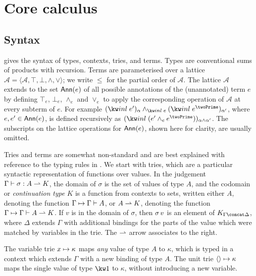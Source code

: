 \section{Core calculus}

\subsection{Syntax}

 gives the syntax of types, contexts, tries, and
terms. Types are conventional sums of products with recursion. Terms are
parameterised over a lattice $\mathcal{A} = \langle \mathcal{A}, \top, \bot,
\wedge, \vee\rangle$; we write $\leq$ for the partial order of $\mathcal{A}$.
The lattice $\mathcal{A}$ extends to the set $\Ann{e}$ of all possible
annotations of the (unannotated) term $e$ by defining $\top_e$, $\bot_e$,
$\wedge_e$ and $\vee_e$ to apply the corresponding operation of $\mathcal{A}$ at
every subterm of $e$. For example $\annot{(\exInl{e'})}{\alpha}
\wedge_{\exInl{e}} \annot{(\exInl{e^\twoPrime})}{\alpha'}$, where $e, e' \in
\Ann{e}$, is defined recursively as $\annot{(\exInl{(e' \wedge_e
e^\twoPrime)})}{\alpha \wedge \alpha'}$. The subscripts on the lattice
operations for $\Ann{e}$, shown here for clarity, are usually omitted.



Tries \cite{hinze00} and terms are somewhat non-standard and are best explained
with reference to the typing rules in
. We start
with tries, which are a particular syntactic representation of functions over
values. In the judgement $\trieType{\sigma}{K}{A}{\Gamma}$, the domain of
$\sigma$ is the set of values of type $A$, and the codomain or
\emph{continuation type} $K$ is a function from contexts to sets, written either
$A$, denoting the function $\Gamma \mapsto \exprTypeJudge{\Gamma}{A}$, or
$\trieTypePartial{K}{A}$, denoting the function $\Gamma \mapsto
\trieTypeJudge{K}{A}{\Gamma}$. If $v$ is in the domain of $\sigma$, then
$\lookup{\sigma}{v}$ is an element of $K_{\Gamma\concat\Delta}$, where $\Delta$
extends $\Gamma$ with additional bindings for the parts of the value which were
matched by variables in the trie. The $\trieArrow$ arrow associates to the
right.




The variable trie $\trieVar{x}{\kappa}$ maps \emph{any} value of type $A$ to
$\kappa$, which is typed in a context which extends $\Gamma$ with a new binding
of type $A$. The unit trie $\trieUnit{\kappa}$ maps the single value of type
$\tyUnit$ to $\kappa$, without introducing a new variable.

